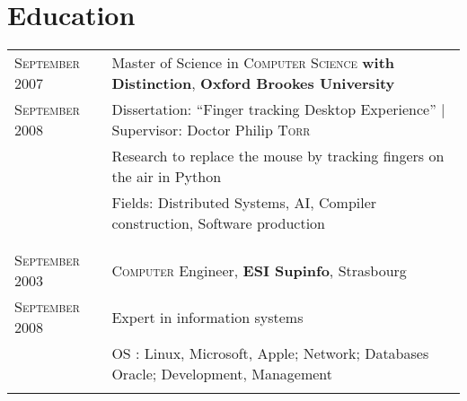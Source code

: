 \documentclass[a4paper,10pt]{article}
\begin{document}
\section{Education}
\begin{tabular}{p{}|p{}}	
\textsc{September} 2007  & Master of Science in \textsc{Computer Science} \textbf{with Distinction}, \textbf{Oxford Brookes University}\\
\textsc{September} 2008 & Dissertation: ``Finger tracking Desktop Experience'' | \small Supervisor: Doctor Philip \textsc{Torr}\\
 & Research to replace the mouse by tracking fingers on the air in Python\\
 & Fields: Distributed Systems, AI, Compiler construction, Software production\\
&\\\multicolumn{2}{c}{} \\
 \textsc{September} 2003 & \textsc{Computer} Engineer, \textbf{ESI Supinfo}, Strasbourg\\
\textsc{September} 2008 & Expert in information systems \\
 & OS : Linux, Microsoft, Apple; Network; Databases Oracle; Development, Management \\\multicolumn{2}{c}{} 
\end{tabular}
\end{document}
